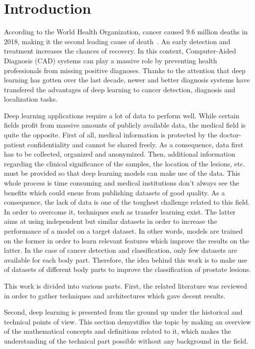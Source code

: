
\chapter{Introduction}
\label{ch:introduction}
\setlength{\marginparwidth}{3cm}\leavevmode {}
According to the World Health Organization, cancer caused $9.6$ million deaths in 2018, making it the second leading cause of death~\cite{44}. An early detection and treatment increases the chances of recovery. In this context, Computer-Aided Diagnosis (CAD) systems can play a massive role by preventing health professionals from missing positive diagnoses. Thanks to the attention that deep learning has gotten over the last decade, newer and better diagnosis systems have transfered the advantages of deep learning to cancer detection, diagnosis and localization tasks.

Deep learning applications require a lot of data to perform well. While certain fields profit from massive amounts of publicly available data, the medical field is quite the opposite. First of all, medical information is protected by the doctor-patient confidentiality and cannot be shared freely. As a consequence, data first has to be collected, organized and anonymized. Then, additional information regarding the clinical significance of the samples, the location of the lesions, etc. must be provided so that deep learning models can make use of the data. This whole process is time consuming and medical institutions don't always see the benefits which could ensue from publishing datasets of good quality. As a consequence, the lack of data is one of the toughest challenge related to this field. In order to overcome it, techniques such as transfer learning exist. The latter aims at using independent but similar datasets in order to increase the performance of a model on a target dataset. In other words, models are trained on the former in order to learn relevant features which improve the results on the latter. In the case of cancer detection and classification, only few datasets are available for each body part. Therefore, the idea behind this work is to make use of datasets of different body parts to improve the classification of prostate lesions.

This work is divided into various parts. First, the related literature was reviewed in order to gather techniques and architectures which gave decent results.

Second, deep learning is presented from the ground up under the historical and technical points of view. This section demystifies the topic by making an overview of the mathematical concepts and definitions related to it, which makes the understanding of the technical part possible without any background in the field.

